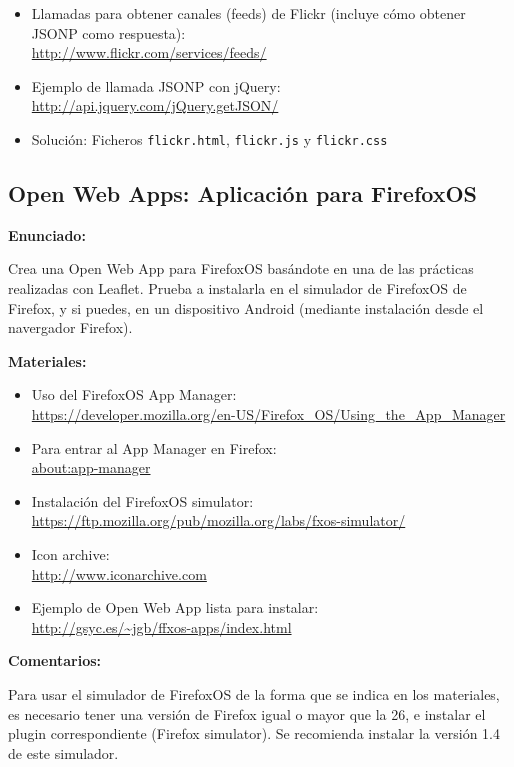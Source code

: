 \begin{itemize}
\item Llamadas para obtener canales (feeds) de Flickr (incluye cómo obtener JSONP como respuesta): \\
  \url{http://www.flickr.com/services/feeds/}
\item Ejemplo de llamada JSONP con jQuery: \\
  \url{http://api.jquery.com/jQuery.getJSON/}
\item Solución: Ficheros \verb|flickr.html|, \verb|flickr.js| y \verb|flickr.css|
\end{itemize}

\subsection{Open Web Apps: Aplicación para FirefoxOS}
\label{subsec:apis-ffxos}

\textbf{Enunciado:}

Crea una Open Web App para FirefoxOS basándote en una de las prácticas realizadas con Leaflet. Prueba a instalarla en el simulador de FirefoxOS de Firefox, y si puedes, en un dispositivo Android (mediante instalación desde el navergador Firefox).

\textbf{Materiales:}

\begin{itemize}
\item Uso del FirefoxOS App Manager: \\
  \url{https://developer.mozilla.org/en-US/Firefox_OS/Using_the_App_Manager}
\item Para entrar al App Manager en Firefox: \\
  \url{about:app-manager}
\item Instalación del FirefoxOS simulator: \\
  \url{https://ftp.mozilla.org/pub/mozilla.org/labs/fxos-simulator/}
\item Icon archive: \\
  \url{http://www.iconarchive.com}
\item Ejemplo de Open Web App lista para instalar: \\
  \url{http://gsyc.es/~jgb/ffxos-apps/index.html}
\end{itemize}

\textbf{Comentarios:}

Para usar el simulador de FirefoxOS de la forma que se indica en los materiales, es necesario tener una versión de Firefox igual o mayor que la 26, e instalar el plugin correspondiente (Firefox simulator). Se recomienda instalar la versión 1.4 de este simulador.

